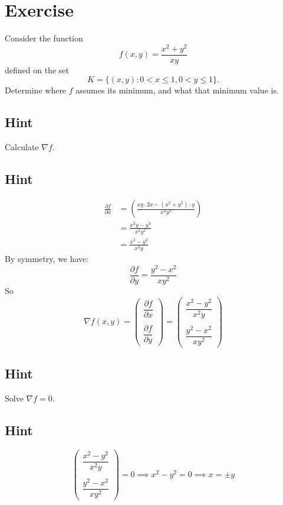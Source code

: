 \documentclass[a4paper,10pt]{article}
\begin{document}
\clearpage

\section{Exercise}

Consider the function
\[
    f(x,y) = \frac{x^2 + y^2}{xy}
\]
defined on the set
\[
    K = \{(x,y): 0 < x \leq 1, 0 < y \leq 1\}.
\]
Determine where $f$ assumes its minimum, and what that minimum value is.

\subsection{Hint}
Calculate $\nabla f$.

\subsection{Hint}
\begin{align*}
    \frac{\partial f}{\partial x} & = \left(\frac{xy\cdot 2x - (x^2+y^2)\cdot y}{x^2y^2}\right) \\
                                  & = \frac{x^2y - y^3}{x^2y^2}                                 \\
                                  & = \frac{x^2 - y^2}{x^2y}
\end{align*}
By symmetry, we have:
\[
    \frac{\partial f}{\partial y} = \frac{y^2 - x^2}{xy^2}
\]
So
\[
    \nabla f(x,y) = \begin{pmatrix}
        \dfrac{\partial f}{\partial x} \\ \\ \dfrac{\partial f}{\partial y}
    \end{pmatrix} = \begin{pmatrix}
        \dfrac{x^2 - y^2}{x^2y} \\ \\ \dfrac{y^2 - x^2}{xy^2}
    \end{pmatrix}
\]

\subsection{Hint}
Solve $\nabla f = 0$.

\subsection{Hint}
\[
    \begin{pmatrix}
        \dfrac{x^2 - y^2}{x^2y} \\ \\ \dfrac{y^2 - x^2}{xy^2}
    \end{pmatrix} = 0 \implies x^2 - y^2 = 0 \implies x = \pm y
\]
\end{document}
